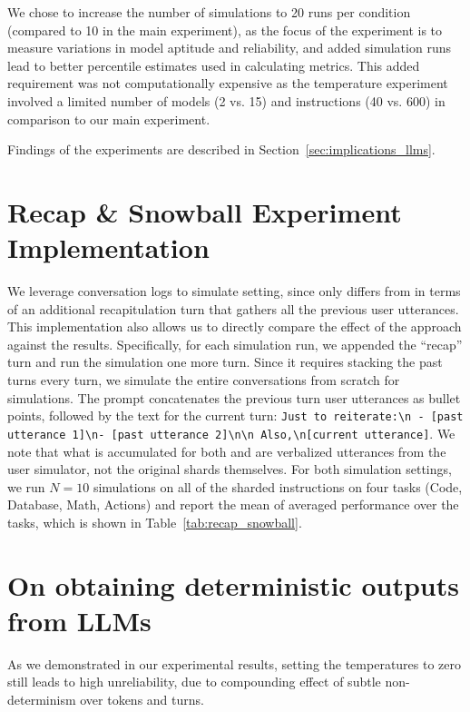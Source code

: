 \documentclass{article}
\begin{document}
\begin{appendices}
We chose to increase the number of simulations to 20 runs per condition (compared to 10 in the main experiment), as the focus of the experiment is to measure variations in model aptitude and reliability, and added simulation runs lead to better percentile estimates used in calculating metrics. This added requirement was not computationally expensive as the temperature experiment involved a limited number of models (2 vs. 15) and instructions (40 vs. 600) in comparison to our main experiment.

Findings of the experiments are described in Section~\ref{sec:implications_llms}.

\section{Recap \& Snowball Experiment Implementation} \label{app:recap_snowball}
We leverage \shardedt conversation logs to simulate \recapt setting, since \recapt only differs from \shardedt in terms of an additional recapitulation turn that gathers all the previous user utterances.
This implementation also allows us to directly compare the effect of the approach against the \shardedt results.
Specifically, for each \shardedt simulation run, we appended the ``recap'' turn and run the simulation one more turn.
Since it requires stacking the past turns every turn, we simulate the entire conversations from scratch for \snowballt simulations.
The prompt concatenates the previous turn user utterances as bullet points, followed by the text for the current turn: \verb|Just to reiterate:\n - [past utterance 1]\n- [past utterance 2]\n\n Also,\n[current utterance]|.
We note that what is accumulated for both \recapt and \snowballt are verbalized utterances from the user simulator, not the original shards themselves.
For both simulation settings, we run $N=10$ simulations on all of the sharded instructions on four tasks (Code, Database, Math, Actions) and report the mean of averaged performance over the tasks, which is shown in Table~\ref{tab:recap_snowball}.

\section{On obtaining deterministic outputs from LLMs} \label{app:randomness}

As we demonstrated in our experimental results, setting the temperatures to zero still leads to high unreliability, due to compounding effect of subtle non-determinism over tokens and turns.


\end{appendices}
\end{document}
